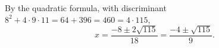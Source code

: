 By the quadratic formula, with discriminant $8^2+4\cdot9\cdot11=64+396=460=4\cdot115$,
\[x=\dfrac{-8\pm2\sqrt{115}}{18}=\boxed{\dfrac{-4\pm\sqrt{115}}{9}}.\]
